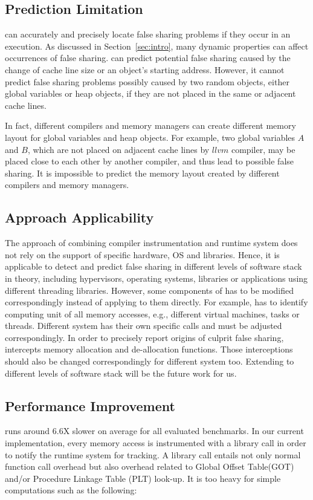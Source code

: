 \label{sec:discussion}

\subsection{Prediction Limitation}
\Predator{} can accurately and precisely locate false sharing problems if they occur
in an execution. 
As discussed in Section~\ref{sec:intro}, many dynamic properties
can affect occurrences of false sharing. 
\Predator{} can predict potential false sharing caused by the change of cache line size 
or an object's starting address.
However, it cannot predict false sharing problems possibly caused by two random objects,
either global variables or heap objects, if they are not placed in the same or adjacent cache lines.

In fact, different compilers and memory managers can create 
different memory layout for global variables and heap objects. 
For example, two global variables $A$ and $B$, which are not placed 
on adjacent cache lines by $llvm$ compiler, may be placed 
close to each other by another compiler, and thus lead to possible false sharing. 
It is impossible to predict the memory layout created by different compilers and memory managers.

\subsection{Approach Applicability}
The approach of combining compiler instrumentation and runtime system 
does not rely on the support of specific hardware, OS and libraries.
Hence, it is applicable to detect and predict false sharing in different levels of 
software stack in theory, including hypervisors, operating systems, libraries or 
applications using different threading libraries.
However, some components of \Predator{} has to be 
modified correspondingly instead of applying \Predator{} to them directly.
For example, \Predator{} has to identify computing unit of all memory accesses, 
e.g., different virtual machines, tasks or threads. 
Different system has their own specific calls and must be adjusted correspondingly.
In order to precisely report origins of culprit false sharing, \Predator{} intercepts 
memory allocation and de-allocation functions. 
Those interceptions should also be changed correspondingly for different system too.
Extending \Predator{} to different levels of software stack will be the future work for us.

\subsection{Performance Improvement}
\Predator{} runs around $6.6$X slower on average for all evaluated benchmarks. 
In our current implementation, every memory access is instrumented with a library call 
in order to notify the runtime system for tracking.
A library call entails not only normal function call overhead but also 
overhead related to Global Offset Table(GOT) and/or Procedure Linkage Table (PLT) look-up. 
It is too heavy for simple computations such as the following:

